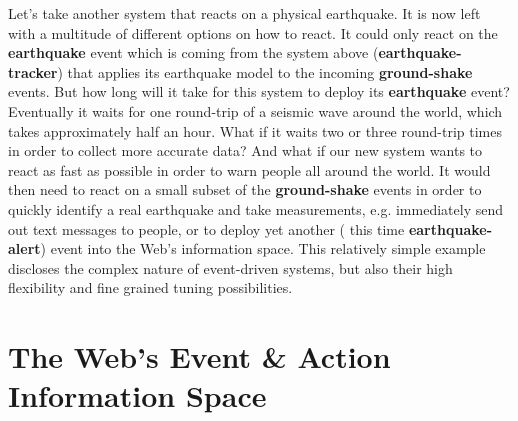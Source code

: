 Let's take another system that reacts on a physical earthquake.
It is now left with a multitude of different options on how to react.
It could only react on the \textrm{\textbf{earthquake}} event which is coming from the system above (\textrm{\textbf{earthquake-tracker}}) that applies its earthquake model to the incoming \textrm{\textbf{ground-shake}} events.
But how long will it take for this system to deploy its \textrm{\textbf{earthquake}} event?
Eventually it waits for one round-trip of a seismic wave around the world, which takes approximately half an hour.
What if it waits two or three round-trip times in order to collect more accurate data?
And what if our new system wants to react as fast as possible in order to warn people all around the world.
It would then need to react on a small subset of the \textrm{\textbf{ground-shake}} events in order to quickly identify a real earthquake and take measurements, e.g. immediately send out text messages to people, or to deploy yet another ( this time \textrm{\textbf{earthquake-alert}}) event into the Web's information space.
This relatively simple example discloses the complex nature of event-driven systems, but also their high flexibility and fine grained tuning possibilities.

\section{The Web's Event \& Action Information Space}


